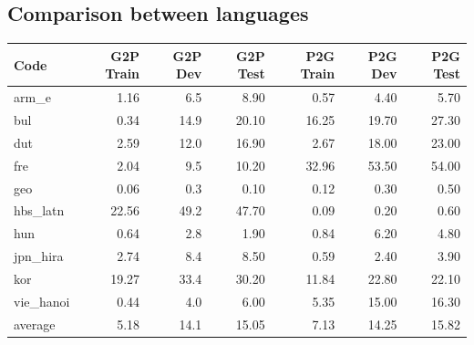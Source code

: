 \documentclass[11pt,a4paper]{article}
\begin{document}
\subsection{Comparison between languages}

\begin{table}[h]
\centering
\begin{tabular}{lrrrrrr}
\toprule
      Code &  G2P Train &  G2P Dev &  G2P Test &  P2G Train &  P2G Dev &  P2G Test \\
\midrule
     arm\_e &       1.16 &      6.5 &      8.90 &       0.57 &     4.40 &      5.70 \\
       bul &       0.34 &     14.9 &     20.10 &      16.25 &    19.70 &     27.30 \\
       dut &       2.59 &     12.0 &     16.90 &       2.67 &    18.00 &     23.00 \\
       fre &       2.04 &      9.5 &     10.20 &      32.96 &    53.50 &     54.00 \\
       geo &       0.06 &      0.3 &      0.10 &       0.12 &     0.30 &      0.50 \\
  hbs\_latn &      22.56 &     49.2 &     47.70 &       0.09 &     0.20 &      0.60 \\
       hun &       0.64 &      2.8 &      1.90 &       0.84 &     6.20 &      4.80 \\
  jpn\_hira &       2.74 &      8.4 &      8.50 &       0.59 &     2.40 &      3.90 \\
       kor &      19.27 &     33.4 &     30.20 &      11.84 &    22.80 &     22.10 \\
 vie\_hanoi &       0.44 &      4.0 &      6.00 &       5.35 &    15.00 &     16.30 \\
 \midrule
   average &       5.18 &     14.1 &     15.05 &       7.13 &    14.25 &     15.82 \\
\bottomrule
\end{tabular}
\end{table}




\end{document}
